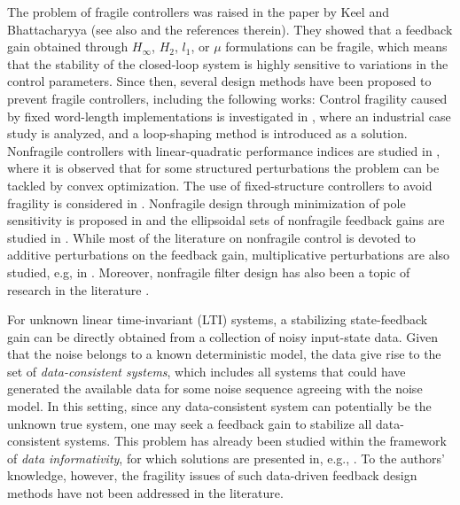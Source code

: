 \documentclass[9pt,shortpaper,twoside,web]{ieeecolor}
\begin{document}
The problem of fragile controllers was raised in the paper by Keel and Bhattacharyya \cite{keel1997robust} (see also \cite{makila1998comments,dorato1998non} and the references therein). They showed that a feedback gain obtained through $H_\infty$, $H_2$, $l_1$, or $\mu$ formulations can be fragile, which means that the stability of the closed-loop system is highly sensitive to variations in the control parameters. Since then, several design methods have been proposed to prevent fragile controllers, including the following works: Control fragility caused by fixed word-length implementations is investigated in \cite{paattilammi2000fragility}, where an industrial case study is analyzed, and a loop-shaping method is introduced as a solution. Nonfragile controllers with linear-quadratic performance indices are studied in \cite{famularo2000robust}, where it is observed that for some structured perturbations the problem can be tackled by convex optimization. The use of fixed-structure controllers to avoid fragility is considered in \cite{keel1999robust,haddad2000robust}. Nonfragile design through minimization of pole
sensitivity is proposed in \cite{whidborne2001reduction} and the ellipsoidal sets of nonfragile feedback gains are studied in \cite{peaucelle2005ellipsoidal}. While most of the literature on nonfragile control is devoted to additive perturbations on the feedback gain, multiplicative perturbations are also studied, e.g, in \cite{yang2000guaranteed,yang2001non}. Moreover, nonfragile filter design has also been a topic of research in the literature \cite{yang2001robust,yang2008non}. 

For unknown linear time-invariant (LTI) systems, a stabilizing state-feedback gain can be directly obtained from a collection of noisy input-state data. Given that the noise belongs to a known deterministic model, the data give rise to the set of 
\emph{data-consistent systems}, which includes all systems that could have generated the available data for some noise sequence agreeing with the noise model. In this setting, since any data-consistent system can potentially be the unknown true system, one may seek a feedback gain to stabilize all data-consistent systems. This problem has already been studied within the framework of \emph{data informativity}, for which solutions are presented in, e.g., \cite{van2020data,HenkSlemma}. To the authors' knowledge, however, the fragility issues of such data-driven feedback design methods have not been addressed in the literature. 
\end{document}
